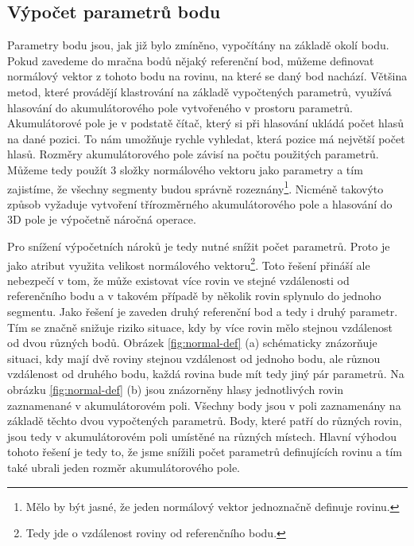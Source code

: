 \documentclass[11pt,twoside,a4paper]{book}
\begin{document}
\newpage
\subsection{Výpočet parametrů bodu}

Parametry bodu jsou, jak již bylo zmíněno, vypočítány na základě okolí bodu. Pokud zavedeme do mračna bodů nějaký referenční bod, můžeme definovat normálový vektor z tohoto bodu na rovinu, na které se daný bod nachází. Většina metod, které provádějí klastrování na základě vypočtených parametrů, využívá hlasování do akumulátorového pole vytvořeného v prostoru parametrů. Akumulátorové pole je v podstatě čítač, který si při hlasování ukládá počet hlasů na dané pozici. To nám umožňuje rychle vyhledat, která pozice má největší počet hlasů. Rozměry akumulátorového pole závisí na počtu použitých parametrů. Můžeme tedy použít 3 složky normálového vektoru jako parametry a tím zajistíme, že všechny segmenty budou správně rozeznány\footnote{Mělo by být jasné, že jeden normálový vektor jednoznačně definuje rovinu.}. Nicméně takovýto způsob vyžaduje vytvoření třírozměrného akumulátorového pole a hlasování do 3D pole je výpočetně náročná operace. 

Pro snížení výpočetních nároků je tedy nutné snížit počet parametrů. Proto je jako atribut využita velikost normálového vektoru\footnote{Tedy jde o vzdálenost roviny od referenčního bodu.}. Toto řešení přináší ale nebezpečí v tom, že může existovat více rovin ve stejné vzdálenosti od referenčního bodu a v takovém případě by několik rovin splynulo do jednoho segmentu. Jako řešení je zaveden druhý referenční bod a tedy i druhý parametr. Tím se značně snižuje riziko situace, kdy by více rovin mělo stejnou vzdálenost od dvou různých bodů. Obrázek \ref{fig:normal-def} (a) schématicky znázorňuje situaci, kdy mají dvě roviny stejnou vzdálenost od jednoho bodu, ale různou vzdálenost od druhého bodu, každá rovina bude mít tedy jiný pár parametrů. Na obrázku \ref{fig:normal-def} (b) jsou znázorněny hlasy jednotlivých rovin zaznamenané v akumulátorovém poli. Všechny body jsou v poli zaznamenány na základě těchto dvou vypočtených parametrů. Body, které patří do různých rovin, jsou tedy v akumulátorovém poli umístěné na různých místech. Hlavní výhodou tohoto řešení je tedy to, že jsme snížili počet parametrů definujících rovinu a tím také ubrali jeden rozměr akumulátorového pole.
\end{document}
